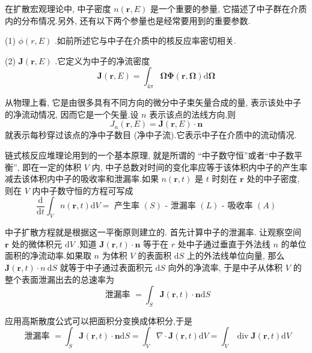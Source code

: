 \documentclass{Sichuan Normal University}
\begin{document}
在扩散宏观理论中, 中子密度 $n(\boldsymbol{r}, E)$ 是一个重要的参量, 它描述了中子群在介质内的分布情况.另外, 还有以下两个参量也是经常要用到的重要参数.

(1) $\phi(r, E)$ .如前所述它与中子在介质中的核反应率密切相关.

(2) $\boldsymbol{J}(\boldsymbol{r}, E)$ .它定义为中子的净流密度
\begin{equation}
    \boldsymbol{J}(\boldsymbol{r}, E)=\int_{4 \pi} \boldsymbol{\Omega} \boldsymbol{\Phi}(\boldsymbol{r}, \boldsymbol{\Omega}) \mathrm{d} \boldsymbol{\Omega}
    \label{eq:中子的净流密度}
\end{equation}

从物理上看, 它是由很多具有不同方向的微分中子束矢量合成的量, 表示该处中子的净流动情况, 因而它是一个矢量.设 $n$ 表示该点的法线方向,则
\begin{equation}
    J_n(\boldsymbol{r}, E)=\boldsymbol{J}(\boldsymbol{r}, E) \cdot \boldsymbol{n}
    \label{eq:中子的净流密度2}
\end{equation}
就表示每秒穿过该点的净中子数目 (净中子流).它表示中子在介质中的流动情况.

链式核反应堆理论用到的一个基本原理, 就是所谓的 “中子数守恒”或者“中子数平衡”, 即在一定的体积 $V$ 内, 中子总数对时间的变化率应等于该体积内中子的产生率减去该体积内中子的吸收率和泄漏率.如果 $n(\boldsymbol{r}, t)$ 是 $t$ 时刻在 $\boldsymbol{r}$ 处的中子密度, 则在 $V$ 内中子数守恒的方程可写成
\begin{equation}
    \frac{\mathrm{d}}{\mathrm{d} t} \int_V n(\boldsymbol{r}, t) \mathrm{d} V=\text { 产生率 }(S) \text { - 泄漏率 }(L) \text { - 吸收率 }(A)
    \label{eq:中子数守恒}
\end{equation}

中子扩散方程就是根据这一平衡原则建立的.
首先计算中子的泄漏率.
让观察空间 $\boldsymbol{r}$ 处的微体积元 $\mathrm{d} V$ .知道 $\boldsymbol{J}(\boldsymbol{r}, t) \cdot \boldsymbol{n}$ 等于在 $r$ 处中子通过垂直于外法线 $n$ 的单位面积的净流动率.如果取 $n$ 为体积 $V$ 的表面积 $\mathrm{d} S$ 上的外法线单位向量, 那么 $\boldsymbol{J}(\boldsymbol{r}, t) \cdot n \mathrm{~d} S$ 就等于中子通过表面积元 $\mathrm{d} S$ 向外的净流率, 于是中子从体积 $V$ 的整个表面泄漏出去的总速率为
\begin{equation}
    \text { 泄漏率 }=\int_S \boldsymbol{J}(\boldsymbol{r}, t) \cdot \boldsymbol{n} \mathrm{d} S
    \label{eq:泄漏率}
\end{equation}

应用高斯散度公式可以把面积分变换成体积分,于是
\begin{equation}
    \text { 泄漏率 }=\int_S \boldsymbol{J}(\boldsymbol{r}, t) \cdot \boldsymbol{n} \mathrm{d} S=\int_V \nabla \cdot \boldsymbol{J}(\boldsymbol{r}, t) \mathrm{d} V=\int_V \operatorname{div} \boldsymbol{J}(\boldsymbol{r}, t) \mathrm{d} V
    \label{eq:泄漏率2}
\end{equation}
\end{document}
